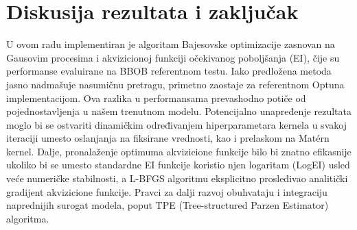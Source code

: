 ﻿\documentclass[11pt,a4paper]{article}
\begin{document}
\section{Diskusija rezultata i zaključak}
U ovom radu implementiran je algoritam Bajesovske optimizacije zasnovan na Gausovim procesima i akvizicionoj funkciji očekivanog poboljšanja (EI), čije su performanse evaluirane na BBOB referentnom testu. Iako predložena metoda jasno nadmašuje nasumičnu pretragu, primetno zaostaje za referentnom Optuna implementacijom. Ova razlika u performansama prevashodno potiče od pojednostavljenja u našem trenutnom modelu. Potencijalno unapređenje rezultata moglo bi se ostvariti dinamičkim određivanjem hiperparametara kernela u svakoj iteraciji umesto oslanjanja na fiksirane vrednosti, kao i prelaskom na Matérn kernel. Dalje, pronalaženje optimuma akvizicione funkcije bilo bi znatno efikasnije ukoliko bi se umesto standardne EI funkcije koristio njen logaritam (LogEI) usled veće numeričke stabilnosti, a L-BFGS algoritmu eksplicitno prosleđivao analitički gradijent akvizicione funkcije. Pravci za dalji razvoj obuhvataju i integraciju naprednijih surogat modela, poput TPE (Tree-structured Parzen Estimator) algoritma.

\printbibliography
\end{document}
